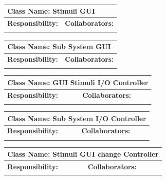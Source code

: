 \documentclass[]{article}
\begin{document}
	\begin{table}[ht]
		\centering
		\begin{tabular}{|p{5cm}|p{5cm}|}
		\hline 
		 \multicolumn{2}{|l|}{\textbf{Class Name: Stimuli GUI}} \\
		\hline
		\textbf{Responsibility:} & \textbf{Collaborators:} \\
		\hline
		\vspace{1in} & \\
		\hline
		\end{tabular}
	\end{table}
	\begin{table}[ht]
		\centering
		\begin{tabular}{|p{5cm}|p{5cm}|}
		\hline 
		 \multicolumn{2}{|l|}{\textbf{Class Name: Sub System GUI}} \\
		\hline
		\textbf{Responsibility:} & \textbf{Collaborators:} \\
		\hline
		\vspace{1in} & \\
		\hline
		\end{tabular}
	\end{table}
	\begin{table}[ht]
		\centering
		\begin{tabular}{|p{5cm}|p{5cm}|}
		\hline 
		 \multicolumn{2}{|l|}{\textbf{Class Name: GUI Stimuli I/O Controller}} \\
		\hline
		\textbf{Responsibility:} & \textbf{Collaborators:} \\
		\hline
		\vspace{1in} & \\
		\hline
		\end{tabular}
	\end{table}
	\begin{table}[ht]
		\centering
		\begin{tabular}{|p{5cm}|p{5cm}|}
		\hline 
		 \multicolumn{2}{|l|}{\textbf{Class Name: Sub System I/O Controller}} \\
		\hline
		\textbf{Responsibility:} & \textbf{Collaborators:} \\
		\hline
		\vspace{1in} & \\
		\hline
		\end{tabular}
	\end{table}
	\begin{table}[ht]
		\centering
		\begin{tabular}{|p{5cm}|p{5cm}|}
		\hline 
		 \multicolumn{2}{|l|}{\textbf{Class Name: Stimuli GUI change Controller}} \\
		\hline
		\textbf{Responsibility:} & \textbf{Collaborators:} \\
		\hline
		\vspace{1in} & \\
		\hline
		\end{tabular}
	\end{table}
\end{document}
